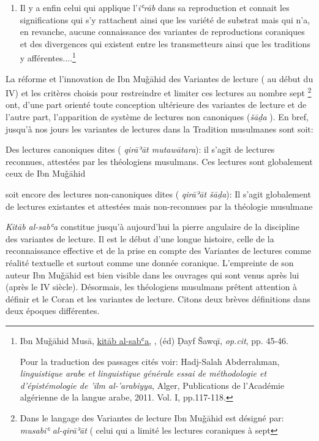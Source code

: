 \documentclass[a4paper,12pt]{report}
\begin{document}
\begin{itemize}
\begin{enumerate}
    \item Il y a enfin celui qui applique l'\textit{iʿr\=ab} dans sa reproduction et connait les significations  qui s'y rattachent ainsi que les variété de substrat mais qui n'a, en revanche, aucune connaissance des variantes de reproductions coraniques et des divergences qui existent entre les transmetteurs ainsi que les traditions y afférentes....\footnote{ Ibn Muǧāhid Musā, \underline {kitāb al-sabʿa,} , (éd) Ḍayf Šawqī, \textit{op.cit}, pp. 45-46. 
    
    Pour la traduction des passages cités voir: Hadj-Salah Abderrahman, \textit{linguistique arabe et linguistique générale essai de méthodologie et d'épistémologie de 'ilm al-'arabiyya}, Alger, Publications de l'Académie algérienne de la langue arabe, 2011. Vol. I, pp.117-118.}
\end{enumerate} 


La  réforme et l'innovation de   Ibn Muǧāhid des Variantes de lecture ( au début du IV) et les critères choisis pour restreindre et limiter ces lectures  au nombre sept \footnote{Dans le langage des Variantes de lecture  Ibn Muǧāhid est désigné par:\textit{ musabiʿ al-qirāʾāt} ( celui qui a limité les lectures coraniques à sept } ont, d'une part  orienté toute conception ultérieure des variantes de lecture et de l'autre part, l'apparition de système de lectures non canoniques (\textit{šāḏa} ). En bref, jusqu'à nos jours les variantes de lectures dans la Tradition musulmanes sont soit: 

 Des lectures canoniques dites ( \textit{qirāʾāt mutawātara}): il s'agit de lectures reconnues, attestées par les théologiens musulmans. Ces lectures  sont globalement ceux de  Ibn Muǧāhid  

 soit encore des lectures non-canoniques dites ( \textit{qirāʾāt šāḏa}): Il s'agit globalement  de lectures existantes et attestées mais non-reconnues par la théologie musulmane   

 \textit{Kitāb al-sabʿa} constitue jusqu'à aujourd'hui la pierre angulaire de la discipline des variantes de lecture. Il est le début d’une longue histoire, celle de la reconnaissance effective et  de la prise en compte des Variantes de lectures comme réalité textuelle  et surtout comme une donnée coranique. 
 L'empreinte de son auteur Ibn Muǧāhid est  bien visible dans les ouvrages qui sont venus après lui (après le IV siècle). Désormais, les théologiens musulmans prêtent attention à définir et le Coran et les variantes de lecture.   Citons deux brèves définitions  dans deux époques différentes. 
 

\end{itemize}
\end{document}
